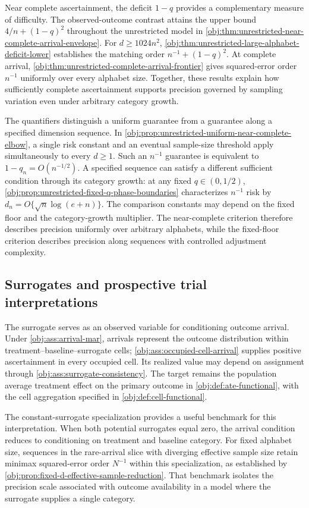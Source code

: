 Near complete ascertainment, the deficit \(1-q\) provides a complementary measure of difficulty. The observed-outcome contrast attains the upper bound \(4/n+(1-q)^2\) throughout the unrestricted model in \cref{obj:thm:unrestricted-near-complete-arrival-envelope}. For \(d\ge1024n^2\), \cref{obj:thm:unrestricted-large-alphabet-deficit-lower} establishes the matching order \(n^{-1}+(1-q)^2\). At complete arrival, \cref{obj:thm:unrestricted-complete-arrival-frontier} gives squared-error order \(n^{-1}\) uniformly over every alphabet size. Together, these results explain how sufficiently complete ascertainment supports precision governed by sampling variation even under arbitrary category growth.

The quantifiers distinguish a uniform guarantee from a guarantee along a specified dimension sequence. In \cref{obj:prop:unrestricted-uniform-near-complete-elbow}, a single risk constant and an eventual sample-size threshold apply simultaneously to every \(d\ge1\). Such an \(n^{-1}\) guarantee is equivalent to \(1-q_n=O(n^{-1/2})\). A specified sequence can satisfy a different sufficient condition through its category growth: at any fixed \(q\in(0,1/2)\), \cref{obj:prop:unrestricted-fixed-q-phase-boundaries} characterizes \(n^{-1}\) risk by \(d_n=O\{\sqrt n\log(e+n)\}\). The comparison constants may depend on the fixed floor and the category-growth multiplier. The near-complete criterion therefore describes precision uniformly over arbitrary alphabets, while the fixed-floor criterion describes precision along sequences with controlled adjustment complexity.

\subsection{Surrogates and prospective trial interpretations}

The surrogate serves as an observed variable for conditioning outcome arrival. Under \cref{obj:ass:arrival-mar}, arrivals represent the outcome distribution within treatment--baseline--surrogate cells; \cref{obj:ass:occupied-cell-arrival} supplies positive ascertainment in every occupied cell. Its realized value may depend on assignment through \cref{obj:ass:surrogate-consistency}. The target remains the population average treatment effect on the primary outcome in \cref{obj:def:ate-functional}, with the cell aggregation specified in \cref{obj:def:cell-functional}.

The constant-surrogate specialization provides a useful benchmark for this interpretation. When both potential surrogates equal zero, the arrival condition reduces to conditioning on treatment and baseline category. For fixed alphabet size, sequences in the rare-arrival slice with diverging effective sample size retain minimax squared-error order \(N^{-1}\) within this specialization, as established by \cref{obj:prop:fixed-d-effective-sample-reduction}. That benchmark isolates the precision scale associated with outcome availability in a model where the surrogate supplies a single category.


